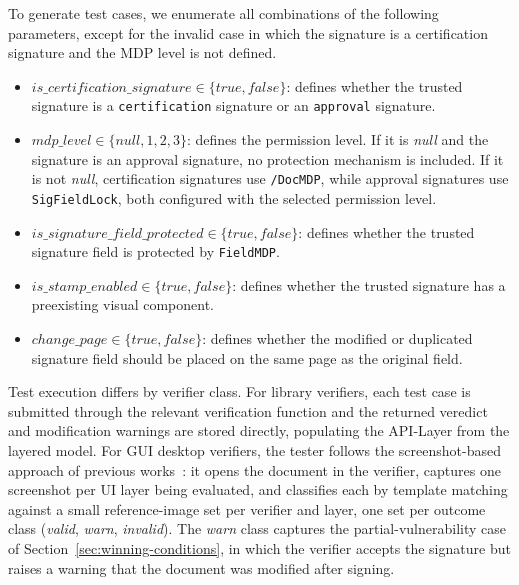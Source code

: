 \documentclass[12pt]{article}
\begin{document}
To generate test cases, we enumerate all combinations of the following parameters, except for the invalid case in which the signature is a certification signature and the MDP level is not defined.

\begin{itemize}
	\item $is\_certification\_signature \in \{true, false\}$: defines whether the trusted signature is a \texttt{certification} signature or an \texttt{approval} signature.
	\item $mdp\_level \in \{null, 1, 2, 3\}$: defines the permission level. If it is \emph{null} and the signature is an approval signature, no protection mechanism is included. If it is not \emph{null}, certification signatures use \texttt{/DocMDP}, while approval signatures use \texttt{SigFieldLock}, both configured with the selected permission level.
	\item $is\_signature\_field\_protected \in \{true, false\}$: defines whether the trusted signature field is protected by \texttt{FieldMDP}.
	\item $is\_stamp\_enabled \in \{true, false\}$: defines whether the trusted signature has a preexisting visual component.
	\item $change\_page \in \{true, false\}$: defines whether the modified or duplicated signature field should be placed on the same page as the original field.
\end{itemize}

Test execution differs by verifier class. For library verifiers, each test case is submitted through the relevant verification function and the returned veredict and modification warnings are stored directly, populating the API-Layer from the layered model. For GUI desktop verifiers, the tester follows the screenshot-based approach of previous works~\cite{pdf-certification-attack}: it opens the document in the verifier, captures one screenshot per UI layer being evaluated, and classifies each by template matching against a small reference-image set per verifier and layer, one set per outcome class (\emph{valid}, \emph{warn}, \emph{invalid}). The \emph{warn} class captures the partial-vulnerability case of Section~\ref{sec:winning-conditions}, in which the verifier accepts the signature but raises a warning that the document was modified after signing.
\end{document}

